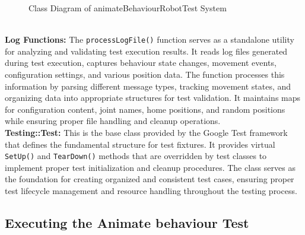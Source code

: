 \documentclass{CSSRforAfrica}
\begin{document}
\begin{figure}[htbp]
\caption{Class Diagram of animateBehaviourRobotTest System}
\label{fig:class-diagram}
\end{figure}\\[1em]
\textbf{Log Functions:} The \texttt{processLogFile()} function serves as a standalone utility for analyzing and validating test execution results. It reads log files generated during test execution, captures behaviour state changes, movement events, configuration settings, and various position data. The function processes this information by parsing different message types, tracking movement states, and organizing data into appropriate structures for test validation. It maintains maps for configuration content, joint names, home positions, and random positions while ensuring proper file handling and cleanup operations.
\\[1em]
\textbf{Testing::Test:} This is the base class provided by the Google Test framework that defines the fundamental structure for test fixtures. It provides virtual \texttt{SetUp()} and \texttt{TearDown()} methods that are overridden by test classes to implement proper test initialization and cleanup procedures. The class serves as the foundation for creating organized and consistent test cases, ensuring proper test lifecycle management and resource handling throughout the testing process.
\subsection{Executing the Animate behaviour Test}
\end{document}
